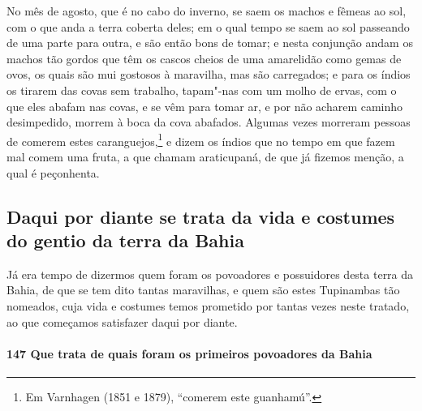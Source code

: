 No mês de agosto, que é no cabo do inverno, se saem os machos e fêmeas ao sol, com o que
anda a terra coberta deles; em o qual tempo se saem ao sol passeando de uma parte para
outra, e são então bons de tomar; e nesta conjunção andam os machos tão gordos que têm os
cascos cheios de uma amarelidão como gemas de ovos, os quais são mui gostosos à maravilha,
mas são carregados; e para os índios os tirarem das covas sem trabalho, tapam"-nas com um
molho de ervas, com o que eles abafam nas covas, e se vêm para tomar ar, e por não acharem
caminho desimpedido, morrem à boca da cova abafados. Algumas vezes morreram pessoas de
comerem estes caranguejos,\footnote{ Em Varnhagen (1851 e 1879), ``comerem este
guanhamú''.} e dizem os índios que no tempo em que fazem mal comem uma fruta, a que chamam
araticupaná, de que já fizemos menção, a qual é peçonhenta.

\subsection{Daqui por diante se trata da vida e costumes do gentio da terra da Bahia}

Já era tempo de dizermos quem foram os povoadores e possuidores desta terra da Bahia, de
que se tem dito tantas maravilhas, e quem são estes Tupinambas tão nomeados, cuja vida e
costumes temos prometido por tantas vezes neste tratado, ao que começamos satisfazer daqui
por diante.

\paragraph{147 Que trata de quais foram os primeiros povoadores da Bahia}

